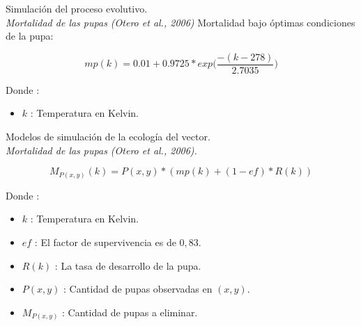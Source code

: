 {

\begin{frame}[c]{Simulación del proceso evolutivo. \\\textit{Mortalidad de las pupas (Otero et al., 2006)}}
  Mortalidad bajo óptimas condiciones de la pupa:
  \begin{center}
    \begin{equation}
    \label{eq:mortalidad-natural-pupas}
        mp(k) = 0.01 + 0.9725 * exp\bigg( \frac{-(k - 278)}{2.7035}\bigg)
    \end{equation}
  \end{center}
  Donde :
    \begin{itemize}
      \item $k$ : Temperatura en Kelvin.
    \end{itemize}
\end{frame}

\begin{frame}[c]{Modelos de simulación de la ecología del vector.\\\textit{Mortalidad de las pupas (Otero et al., 2006).}}
  \begin{center}
    \begin{equation}
        M_{P(x,y)}(k) = P(x,y) * (mp(k) + (1 - ef) * R(k))
    \end{equation}
  \end{center}
  Donde :
    \begin{itemize}
      \item $k$ : Temperatura en Kelvin.
      \item $ef$ : El factor de supervivencia es de $0,83$.
      \item $R(k)$ : La tasa de desarrollo de la pupa.
      \item $P(x, y)$ : Cantidad de pupas observadas en $(x,y)$.
      \item $M_{P(x,y)}$ : Cantidad de pupas a eliminar.
    \end{itemize}
\end{frame}
}


